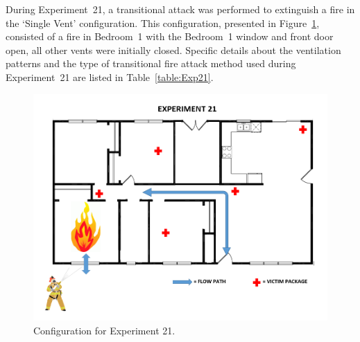 \documentclass[12pt,oneside]{book}
\begin{document}
\FloatBarrier

During Experiment~21, a transitional attack was performed to extinguish a fire in the `Single Vent' configuration. This configuration, presented in Figure~\ref{fig:Single_Vent_ext_alt1}, consisted of a fire in Bedroom~1 with the Bedroom~1 window and front door open, all other vents were initially closed. Specific details about the ventilation patterns and the type of transitional fire attack method used during Experiment~21 are listed in Table~\ref{table:Exp21}.

\begin{figure}[H]
	\centering
	\includegraphics[width=5in]{Figures/General/Exp21.png}
	\caption{Configuration for Experiment 21.}
	\label{fig:Single_Vent_ext_alt1}
\end{figure}

\begin{table}[H]
\caption{Experiment 21}
\centering
{}
\label{table:Exp21}
\end{table}
\end{document}
